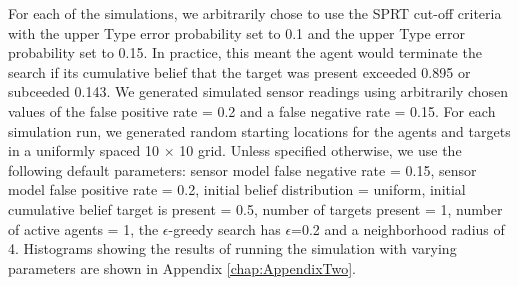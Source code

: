 \par For each of the simulations, we arbitrarily chose to use the SPRT cut-off criteria with the upper Type  error probability set to 0.1 and the upper Type  error probability set to 0.15. In practice, this meant the agent would terminate the search if its cumulative belief that the target was present exceeded 0.895 or subceeded 0.143. We generated simulated sensor readings using arbitrarily chosen values of the false positive rate = 0.2 and a false negative rate = 0.15. For each simulation run, we generated random starting locations for the agents and targets in a uniformly spaced 10 $\times$ 10 grid. Unless specified otherwise, we use the following default parameters: sensor model false negative rate = 0.15, sensor model false positive rate = 0.2, initial belief distribution = uniform, initial cumulative belief target is present = 0.5, number of targets present = 1, number of active agents = 1, the $\epsilon$-greedy search has $\epsilon$=0.2 and a neighborhood radius of 4. Histograms showing the results of running the simulation with varying parameters are shown in Appendix \ref{chap:AppendixTwo}.





